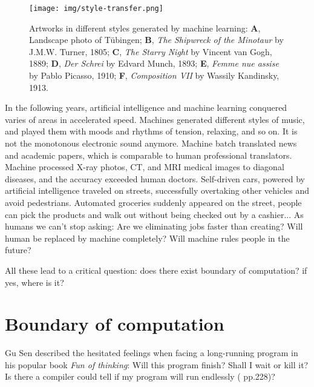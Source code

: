 \documentclass{article}
\begin{document}
\begin{figure}[htbp]
 \centering
 \texttt{[image: img/style-transfer.png]}
 \caption{Artworks in different styles generated by machine learning: \textbf{A}, Landscape photo of Tübingen; \textbf{B}, {\em The Shipwreck of the Minotaur} by J.M.W. Turner, 1805; \textbf{C}, {\em The Starry Night} by Vincent van Gogh, 1889; \textbf{D}, {\em Der Schrei} by Edvard Munch, 1893; \textbf{E}, {\em Femme nue assise} by Pablo Picasso, 1910; \textbf{F}, {\em Composition VII} by Wassily Kandinsky, 1913.}
 \label{fig:style-transfer}
\end{figure}

In the following years, artificial intelligence and machine learning conquered varies of areas in accelerated speed. Machines generated different styles of music, and played them with moods and rhythms of tension, relaxing, and so on. It is not the monotonous electronic sound anymore. Machine batch translated news and academic papers, which is comparable to human professional translators. Machine processed X-ray photos, CT, and MRI medical images to diagonal diseases, and the accuracy exceeded human doctors. Self-driven cars, powered by artificial intelligence traveled on streets, successfully overtaking other vehicles and avoid pedestrians. Automated groceries suddenly appeared on the street, people can pick the products and walk out without being checked out by a cashier... As humans we can't stop asking: Are we eliminating jobs faster than creating? Will human be replaced by machine completely? Will machine rules people in the future?

All these lead to a critical question: does there exist boundary of computation? if yes, where is it?

\section{Boundary of computation}

Gu Sen described the hesitated feelings when facing a long-running program in his popular book {\em Fun of thinking}: Will this program finish? Shall I wait or kill it? Is there a compiler could tell if my program will run endlessly (\cite{GuSen-2012} pp.228)?
\end{document}

